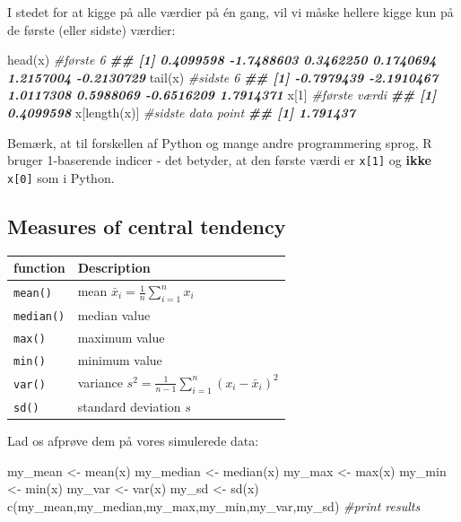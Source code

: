 \documentclass[
]{book}
\newenvironment{Shaded}{\begin{snugshade}}{\end{snugshade}}
\newcommand{\CommentTok}[1]{\textcolor[rgb]{0.56,0.35,0.01}{\textit{#1}}}
\newcommand{\DecValTok}[1]{\textcolor[rgb]{0.00,0.00,0.81}{#1}}
\newcommand{\DocumentationTok}[1]{\textcolor[rgb]{0.56,0.35,0.01}{\textbf{\textit{#1}}}}
\newcommand{\FunctionTok}[1]{\textcolor[rgb]{0.00,0.00,0.00}{#1}}
\newcommand{\NormalTok}[1]{#1}
\newcommand{\OtherTok}[1]{\textcolor[rgb]{0.56,0.35,0.01}{#1}}
\begin{document}
I stedet for at kigge på alle værdier på én gang, vil vi måske hellere kigge kun på de første (eller sidste) værdier:

\begin{Shaded}
\begin{Highlighting}[]
\FunctionTok{head}\NormalTok{(x) }\CommentTok{\#første 6}
\DocumentationTok{\#\# [1]  0.4099598 {-}1.7488603  0.3462250  0.1740694  1.2157004 {-}0.2130729}
\FunctionTok{tail}\NormalTok{(x) }\CommentTok{\#sidste 6}
\DocumentationTok{\#\# [1] {-}0.7979439 {-}2.1910467  1.0117308  0.5988069 {-}0.6516209  1.7914371}
\NormalTok{x[}\DecValTok{1}\NormalTok{] }\CommentTok{\#første værdi}
\DocumentationTok{\#\# [1] 0.4099598}
\NormalTok{x[}\FunctionTok{length}\NormalTok{(x)] }\CommentTok{\#sidste data point}
\DocumentationTok{\#\# [1] 1.791437}
\end{Highlighting}
\end{Shaded}

Bemærk, at til forskellen af Python og mange andre programmering sprog, R bruger 1-baserende indicer - det betyder, at den første værdi er \texttt{x{[}1{]}} og \textbf{ikke} \texttt{x{[}0{]}} som i Python.

\hypertarget{measures-of-central-tendency}{%
\subsection{Measures of central tendency}\label{measures-of-central-tendency}}

\begin{longtable}[]{@{}ll@{}}
\toprule
function & Description \\
\midrule
\endhead
\texttt{mean()} & mean \(\bar{x}_{i} = \frac{1}{n}\sum_{i=1}^{n} x_{i}\) \\
\texttt{median()} & median value \\
\texttt{max()} & maximum value \\
\texttt{min()} & minimum value \\
\texttt{var()} & variance \(s^2 = \frac{1}{n-1}\sum_{i=1}^{n} (x_{i} - \bar{x}_{i})^2\) \\
\texttt{sd()} & standard deviation \(s\) \\
\bottomrule
\end{longtable}

Lad os afprøve dem på vores simulerede data:

\begin{Shaded}
\begin{Highlighting}[]
\NormalTok{my\_mean }\OtherTok{\textless{}{-}} \FunctionTok{mean}\NormalTok{(x)}
\NormalTok{my\_median }\OtherTok{\textless{}{-}} \FunctionTok{median}\NormalTok{(x)}
\NormalTok{my\_max }\OtherTok{\textless{}{-}} \FunctionTok{max}\NormalTok{(x)}
\NormalTok{my\_min }\OtherTok{\textless{}{-}} \FunctionTok{min}\NormalTok{(x)}
\NormalTok{my\_var }\OtherTok{\textless{}{-}} \FunctionTok{var}\NormalTok{(x)}
\NormalTok{my\_sd }\OtherTok{\textless{}{-}} \FunctionTok{sd}\NormalTok{(x)}
\FunctionTok{c}\NormalTok{(my\_mean,my\_median,my\_max,my\_min,my\_var,my\_sd) }\CommentTok{\#print results}
\end{Highlighting}
\end{Shaded}
\end{document}
